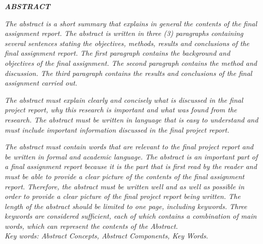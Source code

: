 
\clearpage
{}
\begin{center}
    \textbf{\textit{ABSTRACT}}\\[0.5cm]
\end{center}

\textit{The abstract is a short summary that explains in general the contents of the final assignment report. The abstract is written in three (3) paragraphs containing several sentences stating the objectives, methods, results and conclusions of the final assignment report. The first paragraph contains the background and objectives of the final assignment. The second paragraph contains the method and discussion. The third paragraph contains the results and conclusions of the final assignment carried out.}

\textit{The abstract must explain clearly and concisely what is discussed in the final project report, why this research is important and what was found from the research. The abstract must be written in language that is easy to understand and must include important information discussed in the final project report.}

\textit{The abstract must contain words that are relevant to the final project report and be written in formal and academic language. The abstract is an important part of a final assignment report because it is the part that is first read by the reader and must be able to provide a clear picture of the contents of the final assignment report. Therefore, the abstract must be written well and as well as possible in order to provide a clear picture of the final project report being written. The length of the abstract should be limited to one page, including keywords. Three keywords are considered sufficient, each of which contains a combination of main words, which can represent the contents of the Abstract.}\\[0.6cm]

\noindent\textit{Key words: Abstract Concepts, Abstract Components, Key Words.}
